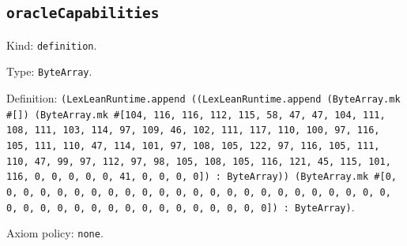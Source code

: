\documentclass[11pt]{article}
\begin{document}
\subsection*{\texttt{oracleCapabilities}}
\noindent Kind: \texttt{definition}.\par
\noindent Type: \texttt{ByteArray}.\par
\noindent Definition: \texttt{(LexLeanRuntime.append ((LexLeanRuntime.append (ByteArray.mk \#[]) (ByteArray.mk \#[104, 116, 116, 112, 115, 58, 47, 47, 104, 111, 108, 111, 103, 114, 97, 109, 46, 102, 111, 117, 110, 100, 97, 116, 105, 111, 110, 47, 114, 101, 97, 108, 105, 122, 97, 116, 105, 111, 110, 47, 99, 97, 112, 97, 98, 105, 108, 105, 116, 121, 45, 115, 101, 116, 0, 0, 0, 0, 0, 41, 0, 0, 0, 0]) : ByteArray)) (ByteArray.mk \#[0, 0, 0, 0, 0, 0, 0, 0, 0, 0, 0, 0, 0, 0, 0, 0, 0, 0, 0, 0, 0, 0, 0, 0, 0, 0, 0, 0, 0, 0, 0, 0, 0, 0, 0, 0, 0, 0, 0, 0]) : ByteArray)}.\par
\noindent Axiom policy: \texttt{none}.\par
\end{document}
